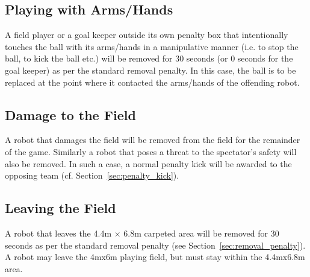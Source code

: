 \documentclass[12pt]{article}
\newcommand{\cf}{\mbox{cf.}\xspace}
\begin{document}
%
%

\subsection{Playing with Arms/Hands}
\label{sec:hand_ball}
A field player or a goal keeper outside its own penalty box that intentionally touches the ball with its arms/hands in a manipulative manner (i.e. to stop the ball, to kick the ball etc.) will be removed for 30 seconds (or 0 seconds for the goal keeper) as per the standard removal penalty. In this case, the ball is to be replaced at the point where it contacted the arms/hands of the offending robot.

\subsection{Damage to the Field}

A robot that damages the field
will be removed from the field for the remainder
of the game. Similarly a robot that poses a threat to the
spectator's safety will also be removed. In such a case, a normal
penalty kick will be awarded to the opposing team (\cf
Section~\ref{sec:penalty_kick}).

\subsection{Leaving the Field}

A robot that leaves the 4.4m $\times$ 6.8m carpeted area will be removed for 30
seconds as per the standard removal penalty (see
Section~\ref{sec:removal_penalty}).  A robot may leave the
4mx6m playing field, but must stay within the 4.4mx6.8m area.
\end{document}
